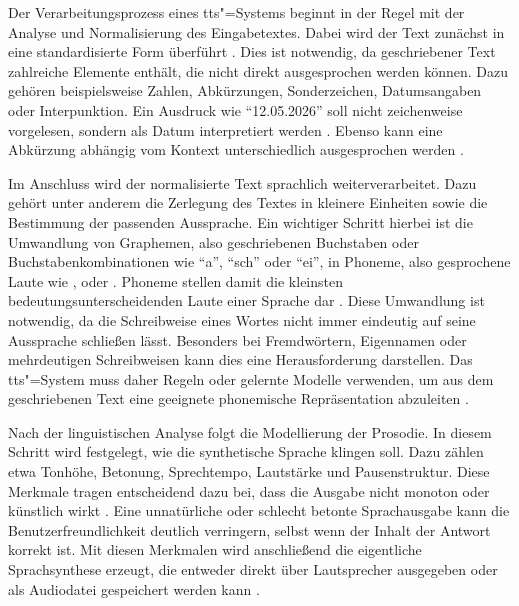 Der Verarbeitungsprozess eines \gls{tts}"=Systems beginnt in der Regel mit der Analyse und Normalisierung des Eingabetextes. Dabei wird der Text zunächst in eine standardisierte Form überführt \autocite{speechtoTextTexttoSpeechRecognition}. Dies ist notwendig, da geschriebener Text zahlreiche Elemente enthält, die nicht direkt ausgesprochen werden können. Dazu gehören beispielsweise Zahlen, Abkürzungen, Sonderzeichen, Datumsangaben oder Interpunktion. Ein Ausdruck wie \enquote{12.05.2026} soll nicht zeichenweise vorgelesen, sondern als Datum interpretiert werden \autocite{speechtoTextTexttoSpeechRecognition,EDPBLeitlinienSprachassistenzsysteme}. Ebenso kann eine Abkürzung abhängig vom Kontext unterschiedlich ausgesprochen werden \autocite{EDPBLeitlinienSprachassistenzsysteme}.

Im Anschluss wird der normalisierte Text sprachlich weiterverarbeitet. Dazu gehört unter anderem die Zerlegung des Textes in kleinere Einheiten sowie die Bestimmung der passenden Aussprache. Ein wichtiger Schritt hierbei ist die Umwandlung von Graphemen, also geschriebenen Buchstaben oder Buchstabenkombinationen wie \enquote{a}, \enquote{sch} oder \enquote{ei}, in Phoneme, also gesprochene Laute wie ,  oder . Phoneme stellen damit die kleinsten bedeutungsunterscheidenden Laute einer Sprache dar  \autocite{endtoEndTexttoSpeech}. Diese Umwandlung ist notwendig, da die Schreibweise eines Wortes nicht immer eindeutig auf seine Aussprache schließen lässt. Besonders bei Fremdwörtern, Eigennamen oder mehrdeutigen Schreibweisen kann dies eine Herausforderung darstellen. Das \gls{tts}"=System muss daher Regeln oder gelernte Modelle verwenden, um aus dem geschriebenen Text eine geeignete phonemische Repräsentation abzuleiten \autocite{speechtoTextTexttoSpeechRecognition,endtoEndTexttoSpeech}.

Nach der linguistischen Analyse folgt die Modellierung der Prosodie. In diesem Schritt wird festgelegt, wie die synthetische Sprache klingen soll. Dazu zählen etwa Tonhöhe, Betonung, Sprechtempo, Lautstärke und Pausenstruktur. Diese Merkmale tragen entscheidend dazu bei, dass die Ausgabe nicht monoton oder künstlich wirkt \autocite{endtoEndTexttoSpeech}. Eine unnatürliche oder schlecht betonte Sprachausgabe kann die Benutzerfreundlichkeit deutlich verringern, selbst wenn der Inhalt der Antwort korrekt ist. Mit diesen Merkmalen wird anschließend die eigentliche Sprachsynthese erzeugt, die entweder direkt über Lautsprecher ausgegeben oder als Audiodatei gespeichert werden kann \autocite{voiceassistantIntroduction}.

